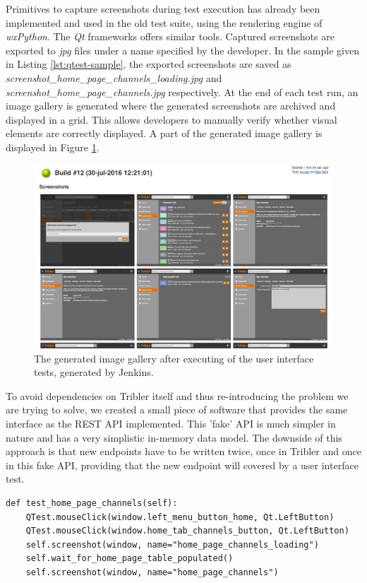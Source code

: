 Primitives to capture screenshots during test execution has already been implemented and used in the old test suite, using the rendering engine of \emph{wxPython}. The \emph{Qt} frameworks offers similar tools. Captured screenshots are exported to \emph{jpg} files under a name specified by the developer. In the sample given in Listing \ref{lst:qtest-sample}, the exported screenshots are saved as \emph{screenshot\_home\_page\_channels\_loading.jpg} and \emph{screenshot\_home\_page\_channels.jpg} respectively. At the end of each test run, an image gallery is generated where the generated screenshots are archived and displayed in a grid. This allows developers to manually verify whether visual elements are correctly displayed. A part of the generated image gallery is displayed in Figure \ref{fig:jenkins-gallery}.

\begin{figure}[h!]
	\centering
	\includegraphics[width=1.0\columnwidth]{images/improving_qa/gallery_jenkins}
	\caption{The generated image gallery after executing of the user interface tests, generated by Jenkins.}
	\label{fig:jenkins-gallery}
\end{figure}

To avoid dependencies on Tribler itself and thus re-introducing the problem we are trying to solve, we created a small piece of software that provides the same interface as the REST API implemented. This 'fake' API is much simpler in nature and has a very simplistic in-memory data model. The downside of this approach is that new endpoints have to be written twice, once in Tribler and once in this fake API, providing that the new endpoint will covered by a user interface test.

\begin{lstlisting}[caption={A sample of a test that tests the new Qt Tribler GUI.},label={lst:qtest-sample}]
def test_home_page_channels(self):
	QTest.mouseClick(window.left_menu_button_home, Qt.LeftButton)
	QTest.mouseClick(window.home_tab_channels_button, Qt.LeftButton)
	self.screenshot(window, name="home_page_channels_loading")
	self.wait_for_home_page_table_populated()
	self.screenshot(window, name="home_page_channels")
\end{lstlisting}

